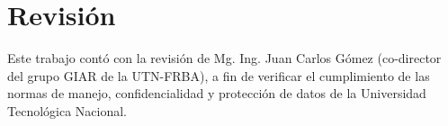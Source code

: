 \chapter*{Revisión}

\noindent Este trabajo contó con la revisión de  Mg. Ing. Juan Carlos Gómez (co-director del grupo GIAR de la UTN-FRBA), a fin de verificar el cumplimiento de las normas de manejo, confidencialidad y protección de datos de la Universidad Tecnológica Nacional.
